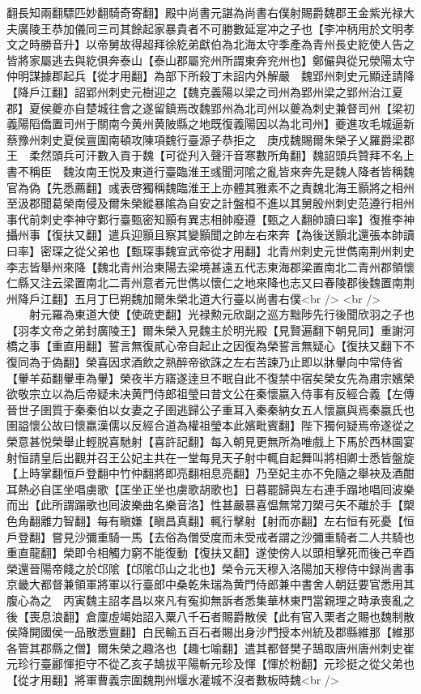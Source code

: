 翻長知兩翻驃匹妙翻騎奇寄翻】殿中尚書元諶為尚書右僕射賜爵魏郡王金紫光禄大夫廣陵王恭加儀同三司其餘起家暴貴者不可勝數延寔冲之子也【李冲柄用於文明孝文之時勝音升】以帝舅故得超拜徐紇弟獻伯為北海太守季產為青州長史紇使人告之皆將家屬逃去與紇俱奔泰山【泰山郡屬兖州所謂東奔兖州也】鄭儼與從兄滎陽太守仲明謀據郡起兵【從才用翻】為部下所殺丁未詔内外解嚴　魏郢州刺史元顯逹請降【降戶江翻】詔郢州刺史元樹迎之【魏克義陽以梁之司州為郢州梁之郢州治江夏郡】夏侯夔亦自楚城往會之遂留鎮焉改魏郢州為北司州以夔為刺史兼督司州【梁初義陽䧟僑置司州于關南今黄州黄陂縣之地既復義陽因以為北司州】夔進攻毛城逼新蔡豫州刺史夏侯亶圍南頓攻陳項魏行臺源子恭拒之　庚戍魏賜爾朱榮子乂羅爵梁郡王　柔然頭兵可汗數入貢于魏【可從刋入聲汗音寒數所角翻】魏詔頭兵贊拜不名上書不稱臣　魏汝南王悦及東道行臺臨淮王彧聞河隂之亂皆來奔先是魏人降者皆稱魏官為偽【先悉薦翻】彧表啓獨稱魏臨淮王上亦體其雅素不之責魏北海王顥將之相州至汲郡聞葛榮南侵及爾朱榮縱暴隂為自安之計盤桓不進以其舅殷州刺史范遵行相州事代前刺史李神守鄴行臺甄密知顥有異志相帥廢遵【甄之人翻帥讀曰率】復推李神攝州事【復扶又翻】遣兵迎顥且察其變顥聞之帥左右來奔【為後送顥北還張本帥讀曰率】密琛之從父弟也【甄琛事魏宣武帝從才用翻】北青州刺史元世儁南荆州刺史李志皆舉州來降【魏北青州治東陽去梁境甚遠五代志東海郡梁置南北二青州郡領懷仁縣又注云梁置南北二青州意者元世儁以懷仁之地來降也志又曰春陵郡後魏置南荆州降戶江翻】五月丁巳朔魏加爾朱榮北道大行臺以尚書右僕<br />
<br />
　　射元羅為東道大使【使疏吏翻】光禄勲元欣副之巡方黜陟先行後聞欣羽之子也【羽孝文帝之弟封廣陵王】爾朱榮入見魏主於明光殿【見賢遍翻下朝見同】重謝河橋之事【重直用翻】誓言無復貳心帝自起止之因復為榮誓言無疑心【復扶又翻下不復同為于偽翻】榮喜因求酒飲之熟醉帝欲誅之左右苦諫乃止即以牀轝向中常侍省【轝羊茹翻轝車為轝】榮夜半方寤遂逹旦不眠自此不復禁中宿矣榮女先為肅宗嬪榮欲敬宗立以為后帝疑未决黄門侍郎祖瑩曰昔文公在秦懷嬴入侍事有反經合義【左傳晉世子圉質于秦秦伯以女妻之子圉逃歸公子重耳入秦秦納女五人懷嬴與焉秦嬴氏也圉謚懷公故曰懷嬴漢儒以反經合道為權祖瑩本此嬪毗賓翻】陛下獨何疑焉帝遂從之榮意甚悦榮舉止輕脱喜馳射【喜許記翻】每入朝見更無所為唯戲上下馬於西林園宴射恒請皇后出觀并召王公妃主共在一堂每見天子射中輒自起舞叫將相卿士悉皆盤旋【上時掌翻恒戶登翻中竹仲翻將即亮翻相息亮翻】乃至妃主亦不免隨之舉袂及酒酣耳熱必自匡坐唱虜歌【匡坐正坐也虜歌胡歌也】日暮罷歸與左右連手蹋地唱囘波樂而出【此所謂蹋歌也囘波樂曲名樂音洛】性甚嚴暴喜愠無常刀槊弓矢不離於手【槊色角翻離力智翻】每有瞋嫌【瞋昌真翻】輒行擊射【射而亦翻】左右恒有死憂【恒戶登翻】嘗見沙彌重騎一馬【去俗為僧受度而未受戒者謂之沙彌重騎者二人共騎也重直龍翻】榮即令相觸力窮不能復動【復扶又翻】遂使傍人以頭相擊死而後己辛酉榮還晉陽帝餞之於邙隂【邙隂邙山之北也】榮令元天穆入洛陽加天穆侍中録尚書事京畿大都督兼領軍將軍以行臺郎中桑乾朱瑞為黄門侍郎兼中書舍人朝廷要官悉用其腹心為之　丙寅魏主詔孝昌以來凡有寃抑無訴者悉集華林東門當親理之時承喪亂之後【喪息浪翻】倉廩虛竭始詔入粟八千石者賜爵散侯【此有官入栗者之賜也魏制散侯降開國侯一品散悉亶翻】白民輸五百石者賜出身沙門授本州統及郡縣維那【維那各管其郡縣之僧】爾朱榮之趣洛也【趣七喻翻】遣其都督樊子鵠取唐州唐州刺史崔元珍行臺酈惲拒守不從乙亥子鵠拔平陽斬元珍及惲【惲於粉翻】元珍挺之從父弟也【從才用翻】將軍曹義宗圍魏荆州堰水灌城不沒者數板時魏<br />
